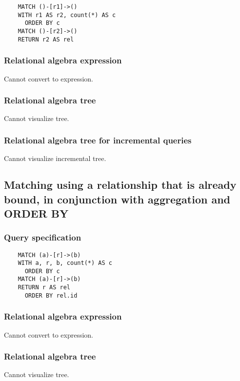 	\begin{lstlisting}
	MATCH ()-[r1]->()
	WITH r1 AS r2, count(*) AS c
	  ORDER BY c
	MATCH ()-[r2]->()
	RETURN r2 AS rel
	\end{lstlisting}


	\subsubsection*{Relational algebra expression}

	Cannot convert to expression.

	\subsubsection*{Relational algebra tree}

	Cannot visualize tree.

	\subsubsection*{Relational algebra tree for incremental queries}

	Cannot visualize incremental tree.
	\subsection{Matching using a relationship that is already bound, in conjunction with aggregation and ORDER BY}

	\subsubsection*{Query specification}

	\begin{lstlisting}
	MATCH (a)-[r]->(b)
	WITH a, r, b, count(*) AS c
	  ORDER BY c
	MATCH (a)-[r]->(b)
	RETURN r AS rel
	  ORDER BY rel.id
	\end{lstlisting}


	\subsubsection*{Relational algebra expression}

	Cannot convert to expression.

	\subsubsection*{Relational algebra tree}

	Cannot visualize tree.


